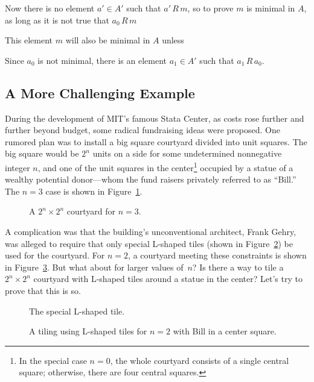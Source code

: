 Now there is no element $a' \in A'$ such that $a'\,R\,m$, so to prove
$m$ is minimal in $A$,  as long as it is not true that $a_0\,R\, m$

This element $m$ will also be minimal in $A$ unless

Since $a_0$ is not minimal, there is an element $a_1 \in A'$ such that
$a_1\,R\,a_0$.

\fi

\subsection{A More Challenging Example}\label{subsec:tile_induction}

During the development of MIT's famous Stata Center, as costs rose
further and further beyond budget, some radical fundraising ideas were
proposed.  One rumored plan was to install a big square courtyard
divided into unit squares.  The big square would be $2^n$ units on a
side for some undetermined nonnegative integer $n$, and one of the
unit squares in the center\footnote{In the special case $n = 0$, the
  whole courtyard consists of a single central square; otherwise,
  there are four central squares.} occupied by a statue of a wealthy
potential donor---whom the fund raisers privately referred to as
``Bill.''  The $n = 3$ case is shown in Figure~\ref{fig:2nx2n-tile}.

\begin{figure}


\caption{A $2^n \times 2^n$ courtyard for $n = 3$.}
\label{fig:2nx2n-tile}
\end{figure}

A complication was that the building's unconventional architect, Frank
Gehry, was alleged to require that only special L-shaped tiles (shown
in Figure~\ref{fig:Ltile}) be used for the courtyard.  For $n = 2$, a
courtyard meeting these constraints is shown in
Figure~\ref{fig:2Ltile}.  But what about for larger values of~$n$?  Is
there a way to tile a $2^n \times 2^n$ courtyard with L-shaped tiles
around a statue in the center?  Let's try to prove that this is so.

\begin{figure}


\caption{The special L-shaped tile.}
\label{fig:Ltile}
\end{figure}

\begin{figure}


\caption{A tiling using L-shaped tiles for $n = 2$ with Bill in a
  center square.}
\label{fig:2Ltile}
\end{figure}

